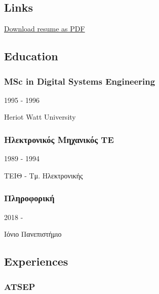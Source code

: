 \documentclass[english,]{article}
\begin{document}
\hypertarget{links}{%
\subsection{Links}\label{links}}

\href{pdf/cv.pdf}{Download resume as PDF}

\hypertarget{education}{%
\subsection{\texorpdfstring{{ \emph{} \emph{} }
Education}{    Education}}\label{education}}

\hypertarget{msc-in-digital-systems-engineering}{%
\subsubsection{MSc in Digital Systems
Engineering}\label{msc-in-digital-systems-engineering}}

1995 - 1996

Heriot Watt University

\hypertarget{ux3b7ux3bbux3b5ux3baux3c4ux3c1ux3bfux3bdux3b9ux3baux3ccux3c2-ux3bcux3b7ux3c7ux3b1ux3bdux3b9ux3baux3ccux3c2-ux3c4ux3b5}{%
\subsubsection{Ηλεκτρονικός Μηχανικός
ΤΕ}\label{ux3b7ux3bbux3b5ux3baux3c4ux3c1ux3bfux3bdux3b9ux3baux3ccux3c2-ux3bcux3b7ux3c7ux3b1ux3bdux3b9ux3baux3ccux3c2-ux3c4ux3b5}}

1989 - 1994

ΤΕΙΘ - Τμ. Ηλεκτρονικής

\hypertarget{ux3c0ux3bbux3b7ux3c1ux3bfux3c6ux3bfux3c1ux3b9ux3baux3ae}{%
\subsubsection{Πληροφορική}\label{ux3c0ux3bbux3b7ux3c1ux3bfux3c6ux3bfux3c1ux3b9ux3baux3ae}}

2018 -

Ιόνιο Πανεπιστήμιο

\hypertarget{experiences}{%
\subsection{\texorpdfstring{{ \emph{} \emph{} }
Experiences}{    Experiences}}\label{experiences}}

\hypertarget{atsep}{%
\subsubsection{ATSEP}\label{atsep}}
\end{document}
